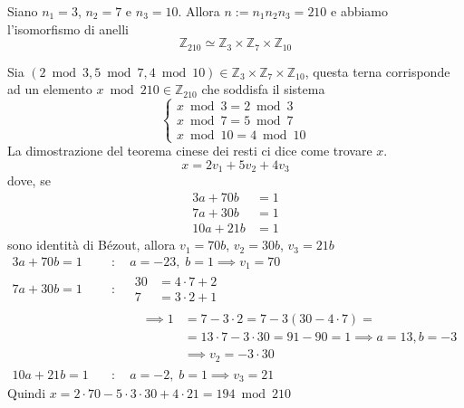 \documentclass[../main.tex]{subfiles}
\begin{document}
\begin{example}
    Siano $n_1 = 3$, $n_2 = 7$ e $n_3 = 10$. Allora $n := n_1 n_2 n_3 = 210$ e abbiamo l'isomorfismo di anelli
    \[
        \mathbb{Z}_{210} \simeq \mathbb{Z}_3 \times \mathbb{Z}_7 \times \mathbb{Z}_{10}
    \]

    Sia $(2 \bmod 3, 5 \bmod 7, 4 \bmod 10) \in \mathbb{Z}_3 \times \mathbb{Z}_7 \times \mathbb{Z}_{10}$, questa terna corrisponde ad un elemento $x \bmod 210 \in \mathbb{Z}_{210}$ che soddisfa il sistema
    \begin{equation*}
        \begin{cases}
            x\bmod 3 = 2\bmod 3 \\
            x\bmod 7 = 5\bmod 7 \\
            x\bmod 10 = 4\bmod 10
        \end{cases}
    \end{equation*}
    La dimostrazione del teorema cinese dei resti ci dice come trovare $x$.
    \begin{equation*}
        x = 2 v_1 + 5 v_2 + 4 v_3
    \end{equation*}
    dove, se
    \begin{align*}
        3 a + 70 b  & = 1 \\
        7 a + 30 b  & = 1 \\
        10 a + 21 b & = 1
    \end{align*}
    sono identità di Bézout, allora $v_1 = 70 b$, $v_2 = 30 b$, $v_3 = 21 b$
    \[
        \begin{aligned}
            3 a + 70 b = 1  & \quad : \quad a = -23, \; b = 1 \implies v_1 = 70                       \\
            7 a + 30 b = 1  & \quad : \quad \begin{aligned}
                                                30 & = 4 \cdot 7 + 2 \\
                                                7  & = 3 \cdot 2 + 1
                                            \end{aligned}
            \\
                            &
            \begin{aligned}
                \quad \qquad\implies 1 & = 7 - 3 \cdot 2 = 7 - 3(30 - 4 \cdot 7) =                        \\
                                       & =  13 \cdot 7 - 3 \cdot 30 = 91 - 90 = 1 \implies a = 13, b = -3 \\
                                       & \implies v_2 = -3 \cdot 30
            \end{aligned} \\
            10 a + 21 b = 1 & \quad : \quad  a = -2, \; b = 1 \implies v_3 = 21
        \end{aligned}
    \]
    Quindi $x = 2 \cdot 70 - 5 \cdot 3 \cdot 30 + 4 \cdot 21 = 194\bmod 210$
\end{example}
\end{document}
